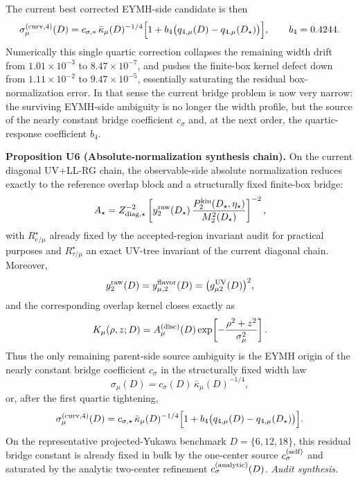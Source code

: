 \documentclass[aps,prd,onecolumn,notitlepage,nofootinbib,superscriptaddress,11pt,floatfix]{revtex4-2}
\begin{document}
The current best corrected EYMH-side candidate is then
\[
\sigma_\mu^{\rm(curv,4)}(D)
=
c_{\sigma,*}\,\bar\kappa_\mu(D)^{-1/4}
\Bigl[1+b_4\bigl(q_{4,\mu}(D)-q_{4,\mu}(D_\star)\bigr)\Bigr],
\qquad
b_4=0.4244.
\]
Numerically this single quartic correction collapses the remaining width drift from $1.01\times10^{-3}$ to $8.47\times10^{-7}$, and pushes the finite-box kernel defect down from $1.11\times10^{-2}$ to $9.47\times10^{-5}$, essentially saturating the residual box-normalization error. In that sense the current bridge problem is now very narrow: the surviving EYMH-side ambiguity is no longer the width profile, but the source of the nearly constant bridge coefficient $c_\sigma$ and, at the next order, the quartic-response coefficient $b_4$.

\medskip\noindent\textbf{Proposition U6 (Absolute-normalization synthesis chain).}
On the current diagonal UV+LL-RG chain, the observable-side absolute normalization reduces exactly to the reference overlap block and a structurally fixed finite-box bridge:
\[
A_\star
=
Z_{{\rm diag},\star}^{-2}
\left[
y_2^{\rm raw}(D_\star)\,
\frac{P_2^{\rm kin}(D_\star,\eta_\star)}{M_2^2(D_\star)}
\right]^{-2},
\]
with \(R_{e/\mu}^\star\) already fixed by the accepted-region invariant audit for practical purposes and \(R_{\tau/\mu}^\star\) an exact UV-tree invariant of the current diagonal chain.  Moreover,
\[
y_2^{\rm raw}(D)=y_{\mu,2}^{\rm flavor}(D)=\bigl(g_{\mu 2}^{\rm UV}(D)\bigr)^2,
\]
and the corresponding overlap kernel closes exactly as
\[
K_\mu(\rho,z;D)=A_\mu^{\rm(disc)}(D)\exp\!\left[-\frac{\rho^2+z^2}{\sigma_\mu^2}\right].
\]
Thus the only remaining parent-side source ambiguity is the EYMH origin of the nearly constant bridge coefficient \(c_\sigma\) in the structurally fixed width law
\[
\sigma_\mu(D)=c_\sigma(D)\,\bar\kappa_\mu(D)^{-1/4},
\]
or, after the first quartic tightening,
\[
\sigma_\mu^{\rm(curv,4)}(D)
=
c_{\sigma,\star}\,\bar\kappa_\mu(D)^{-1/4}
\Bigl[1+b_4\bigl(q_{4,\mu}(D)-q_{4,\mu}(D_\star)\bigr)\Bigr].
\]
On the representative projected-Yukawa benchmark \(D=\{6,12,18\}\), this residual bridge constant is already fixed in bulk by the one-center source \(c_\sigma^{\rm(self)}\) and saturated by the analytic two-center refinement \(c_\sigma^{\rm(analytic)}(D)\).
\emph{Audit synthesis.}
\end{document}
